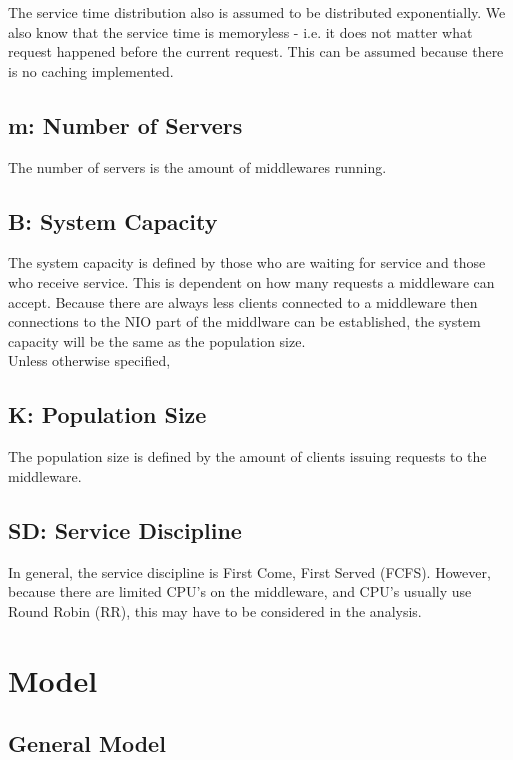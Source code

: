\documentclass[a4paper]{article}
\begin{document}
The service time distribution also is assumed to be distributed exponentially. We also know that the service time is memoryless - i.e. it does not matter what request happened before the current request. This can be assumed because there is no caching implemented.

\subsection{m: Number of Servers}

The number of servers is the amount of middlewares running.

\subsection{B: System Capacity}

The system capacity is defined by those who are waiting for service and those who receive service.  This is dependent on how many requests a middleware can accept. Because there are always less clients connected to a middleware then connections to the NIO part of the middlware can be established, the system capacity will be the same as the population size.\\

Unless otherwise specified, 

\subsection{K: Population Size}

The population size is defined by the amount of clients issuing requests to the middleware.

\subsection{SD: Service Discipline}

In general, the service discipline is First Come, First Served (FCFS). However, because there are limited CPU's on the middleware, and CPU's usually use Round Robin (RR), this may have to be considered in the analysis.


\section{Model}

\subsection{General Model}
\end{document}
